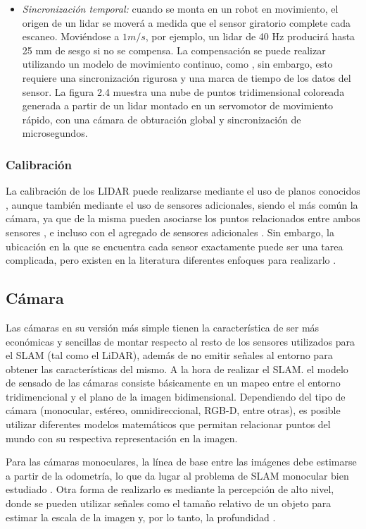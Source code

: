 \begin{itemize}
    \item \textit{Sincronización temporal:} cuando se monta en un robot en movimiento, el origen de un lidar se moverá a medida que el sensor giratorio complete cada escaneo. Moviéndose a $1m/s$, por ejemplo, un lidar de 40 Hz producirá hasta 25 mm de sesgo si no se compensa. La compensación se puede realizar utilizando un modelo de movimiento continuo, como \cite{alismail2014}, sin embargo, esto requiere una sincronización rigurosa y una marca de tiempo de los datos del sensor. La figura 2.4 muestra una nube de puntos tridimensional coloreada generada a partir de un lidar montado en un servomotor de movimiento rápido, con una cámara de obturación global y sincronización de microsegundos.
\end{itemize}

\subsubsection{Calibración}
La calibración de los LIDAR puede realizarse mediante el uso de planos conocidos \cite{habib2010}, aunque también mediante el uso de sensores adicionales, siendo el más común la cámara, ya que de la misma pueden asociarse los puntos relacionados entre ambos sensores \cite{an2020}, e incluso con el agregado de sensores adicionales \cite{domhof2019}. Sin embargo, la ubicación en la que se encuentra cada sensor exactamente puede ser una tarea complicada, pero existen en la literatura diferentes enfoques para realizarlo \cite{kim2020}.
\fi

\subsection{Cámara}
Las cámaras en su versión más simple tienen la característica de ser más económicas y sencillas de montar respecto al resto de los sensores utilizados para el SLAM (tal como el LiDAR), además de no emitir señales al entorno para obtener las características del mismo. A la hora de realizar el SLAM. el modelo de sensado de las cámaras consiste básicamente en un mapeo entre el entorno tridimencional y el plano de la imagen bidimensional. Dependiendo del tipo de cámara (monocular, estéreo, omnidireccional, RGB-D, entre otras), es posible utilizar diferentes modelos matemáticos que permitan relacionar puntos del mundo con su respectiva representación en la imagen.

Para las cámaras monoculares, la línea de base entre las imágenes debe estimarse a partir de la odometría, lo que da lugar al problema de SLAM monocular bien estudiado \cite{sola2007,murray2007,davison2007}. Otra forma de realizarlo es mediante la percepción de alto nivel, donde se pueden utilizar señales como el tamaño relativo de un objeto para estimar la escala de la imagen y, por lo tanto, la profundidad \cite{botterill2013}.

